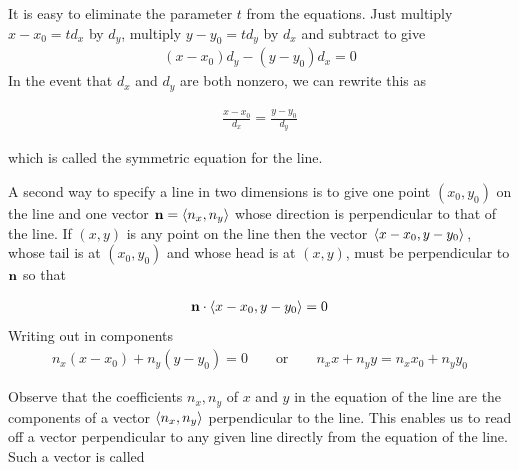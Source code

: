 It is easy to eliminate the parameter $t$ from the equations. Just 
multiply $x-x_0=t d_x$ by $d_y$, multiply $y-y_0=t d_y$ by $d_x$
and subtract to give
\begin{align*}
(x-x_0)d_y-(y-y_0)d_x=0
\end{align*}
In the event that $d_x$ and $d_y$ are both nonzero, we can rewrite this
as
\begin{impeqn}\label{eqn symm eqn line} 
\begin{align*}
   \frac{x-x_0}{d_x}=\frac{y-y_0}{d_y}
\end{align*}
\end{impeqn}
which is called the symmetric equation for the line. 


A second way to specify a line in two dimensions is to give one point
$(x_0,y_0)$ on the line and one vector $\mathbf{n}=\left< n_x,n_y\right> $ whose 
direction is  perpendicular to that of the line.
%
If $(x,y)$ is any point on the line then the vector $\left< x-x_0,y-y_0\right> $, 
whose tail is at $(x_0,y_0)$ and whose head is at $(x,y)$,   
must be perpendicular to $\mathbf{n}$ so that
\begin{impeqn}\label{eqn line}
\begin{align*}
\mathbf{n}\cdot\left< x-x_0,y-y_0\right> =0
\end{align*}
Writing out in components
\begin{align*}
n_x(x-x_0)+n_y(y-y_0)=0\qquad\text{or}\qquad n_xx+n_yy= n_xx_0+n_yy_0
\end{align*}
\end{impeqn}\noindent
Observe that the coefficients $n_x,n_y$ of $x$ and $y$ in the equation
of the line are the components of a vector $\left< n_x,n_y\right> $ perpendicular 
to the line. This enables us to read off a vector perpendicular to any
given line directly from the equation of the line. Such a vector is called 
